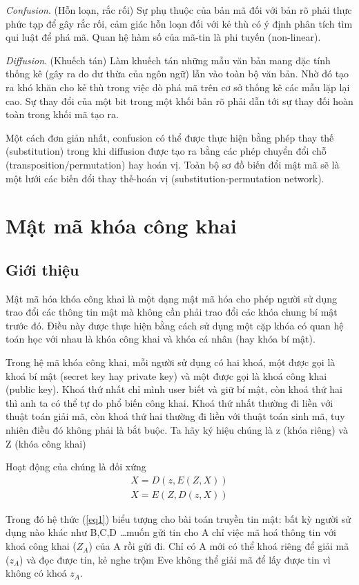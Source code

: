 \documentclass[a4paper,12pt]{report}
\begin{document}
\textit{Confusion}. (Hỗn loạn, rắc rối) Sự phụ thuộc của bản mã đối với bản rõ phải thực phức tạp để gây rắc rối, cảm giác hỗn loạn đối với kẻ thù có ý định phân tích tìm qui luật để phá mã. Quan hệ hàm số của mã-tin là phi tuyến (non-linear).

\textit{Diffusion}. (Khuếch tán) Làm khuếch tán những mẫu văn bản mang đặc tính thống kê (gây ra do dư thừa của ngôn ngữ) lẫn vào toàn bộ văn bản. Nhờ đó tạo ra khó khăn cho kẻ thù trong việc dò phá mã trên cơ sở thống kê các mẫu lặp lại cao. Sự thay đổi của một bit trong một khối bản rõ phải dẫn tới sự thay đối hoàn toàn trong khối mã tạo ra.

Một cách đơn giản nhất, confusion có thể được thực hiện bằng phép thay thế (substitution) trong khi diffusion được tạo ra bằng các phép chuyển đổi chỗ (transposition/permutation) hay hoán vị. Toàn bộ sơ đồ biến đổi mật mã sẽ là một lưới các biến đổi thay thế-hoán vị (substitution-permutation network).
\section{Mật mã khóa công khai}
\subsection*{Giới thiệu}
Mật mã hóa khóa công khai là một dạng mật mã hóa cho phép người sử dụng trao đổi các thông tin mật mà không cần phải trao đổi các khóa chung bí mật trước đó. Điều này được thực hiện bằng cách sử dụng một cặp khóa có quan hệ toán học với nhau là khóa công khai và khóa cá nhân (hay khóa bí mật). 

Trong hệ mã khóa công khai, mỗi người sử dụng có hai khoá, một được gọi là khoá bí mật (secret key hay private key) và một được gọi là khoá công khai (public key). Khoá thứ
nhất chỉ mình user biết và giữ bí mật, còn khoá thứ hai thì anh ta có thể tự do phổ biến
công khai. Khoá thứ nhất thường đi liền với thuật toán giải mã, còn khoá thứ hai thường đi liền với thuật toán sinh mã, tuy nhiên điều đó không phải là bắt buộc. Ta hãy ký hiệu chúng là z (khóa riêng) và Z (khóa công khai)

Hoạt động của chúng là đối xứng
\begin{align}
X = D(z, E(Z,X)) \label{eq1} \\
X = E(Z, D(z,X)) \label{eq2}
\end{align}

Trong đó hệ thức (\ref{eq1}) biểu tượng cho bài toán truyền tin mật: bất kỳ người sử dụng nào khác như B,C,D \ldots muốn gửi tin cho A chỉ việc mã hoá thông tin với khoá công khai ($Z_A$) của A rồi gửi đi. Chỉ có A mới có thể khoá riêng để giải mã ($z_A$) và đọc được tin, kẻ nghe trộm Eve không thể giải mã để lấy được tin vì không có khoá $z_A$.
\end{document}
